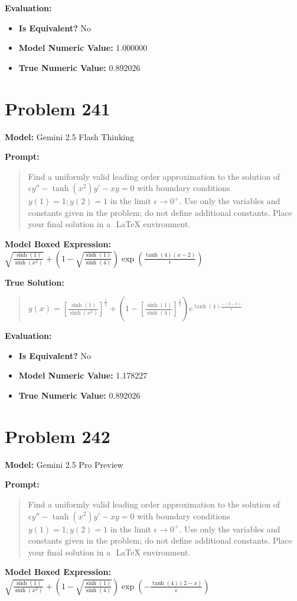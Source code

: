 \documentclass{article}
\begin{document}
{\textbf{Evaluation:}
\begin{itemize}
\item \textbf{Is Equivalent?} No
\item \textbf{Model Numeric Value:} 1.000000
\item \textbf{True Numeric Value:} 0.892026
\end{itemize}
\vspace{1cm}
\section*{Problem 241}
\textbf{Model:} Gemini 2.5 Flash Thinking

\textbf{Prompt:}
\begin{quote}
Find a uniformly valid leading order approximation to the solution of $\epsilon y'' - \tanh(x^2)y' - xy = 0$ with boundary conditions $y(1) = 1; y(2) = 1$ in the limit $\epsilon \to 0^+$. Use only the variables and constants given in the problem; do not define additional constants. Place your final solution in a $\boxed{}$ LaTeX environment.
\end{quote}
\textbf{Model Boxed Expression:} $\sqrt{\frac{\sinh(1)}{\sinh(x^2)}} + \left(1-\sqrt{\frac{\sinh(1)}{\sinh(4)}}\right)\exp\left(\frac{\tanh(4)(x-2)}{\epsilon}\right)$

\textbf{True Solution:}
\begin{quote}
$y(x) = [\frac{\sinh(1)}{\sinh(x^2)}]^\frac{1}{2} + (1-[\frac{\sinh(1)}{\sinh(4)}]^\frac{1}{2})e^{\tanh(4)\frac{-(2-x)}{\epsilon}}$
\end{quote}

\textbf{Evaluation:}
\begin{itemize}
\item \textbf{Is Equivalent?} No
\item \textbf{Model Numeric Value:} 1.178227
\item \textbf{True Numeric Value:} 0.892026
\end{itemize}
\vspace{1cm}
\section*{Problem 242}
\textbf{Model:} Gemini 2.5 Pro Preview

\textbf{Prompt:}
\begin{quote}
Find a uniformly valid leading order approximation to the solution of $\epsilon y'' - \tanh(x^2)y' - xy = 0$ with boundary conditions $y(1) = 1; y(2) = 1$ in the limit $\epsilon \to 0^+$. Use only the variables and constants given in the problem; do not define additional constants. Place your final solution in a $\boxed{}$ LaTeX environment.
\end{quote}
\textbf{Model Boxed Expression:} $\sqrt{\frac{\sinh(1)}{\sinh(x^2)}} + \left(1 - \sqrt{\frac{\sinh(1)}{\sinh(4)}}\right) \exp\left(-\frac{\tanh(4)(2-x)}{\epsilon}\right)$

}
\end{document}
